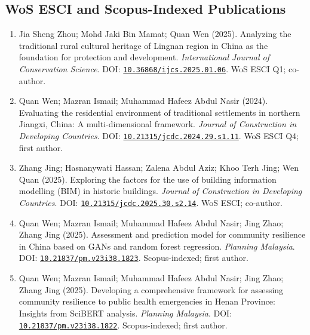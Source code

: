 \documentclass[11pt,a4paper]{article}
\newcommand{\doi}[1]{\href{https://doi.org/#1}{\nolinkurl{#1}}}
\newcommand{\pub}[6]{\item #1 (#2). #3. \textit{#4}. DOI: \doi{#5}. #6}
\begin{document}
\subsection*{WoS ESCI and Scopus-Indexed Publications}
\begin{enumerate}
  \pub{Jia Sheng Zhou; Mohd Jaki Bin Mamat; Quan Wen}{2025}{Analyzing the traditional rural cultural heritage of Lingnan region in China as the foundation for protection and development}{International Journal of Conservation Science}{10.36868/ijcs.2025.01.06}{WoS ESCI Q1; co-author.}
  \pub{Quan Wen; Mazran Ismail; Muhammad Hafeez Abdul Nasir}{2024}{Evaluating the residential environment of traditional settlements in northern Jiangxi, China: A multi-dimensional framework}{Journal of Construction in Developing Countries}{10.21315/jcdc.2024.29.s1.11}{WoS ESCI Q4; first author.}
  \pub{Zhang Jing; Hasnanywati Hassan; Zalena Abdul Aziz; Khoo Terh Jing; Wen Quan}{2025}{Exploring the factors for the use of building information modelling (BIM) in historic buildings}{Journal of Construction in Developing Countries}{10.21315/jcdc.2025.30.s2.14}{WoS ESCI; co-author.}
  \pub{Quan Wen; Mazran Ismail; Muhammad Hafeez Abdul Nasir; Jing Zhao; Zhang Jing}{2025}{Assessment and prediction model for community resilience in China based on GANs and random forest regression}{Planning Malaysia}{10.21837/pm.v23i38.1823}{Scopus-indexed; first author.}
  \pub{Quan Wen; Mazran Ismail; Muhammad Hafeez Abdul Nasir; Jing Zhao; Zhang Jing}{2025}{Developing a comprehensive framework for assessing community resilience to public health emergencies in Henan Province: Insights from SciBERT analysis}{Planning Malaysia}{10.21837/pm.v23i38.1822}{Scopus-indexed; first author.}
\end{enumerate}
\end{document}
